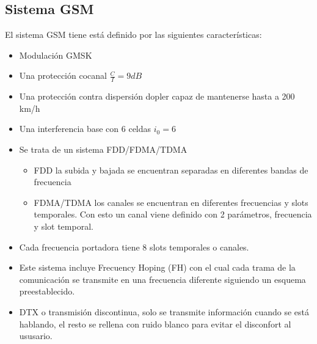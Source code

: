 \subsection{Sistema \acrshort{GSM}}
\label{sub:GSM}
El sistema \acrshort{GSM} tiene está definido por las siguientes características:
\begin{itemize}
	\item Modulación GMSK
	\item Una protección cocanal $\frac{C}{I}=9dB$
	\item Una protección contra dispersión dopler capaz de mantenerse hasta a 200 km/h
	\item Una interferencia base con 6 celdas $i_0=6$
	\item Se trata de un sistema \acrshort{FDD}/\acrshort{FDMA}/\acrshort{TDMA}
	\begin{itemize}
		\item \acrshort{FDD} la subida y bajada se encuentran separadas en diferentes bandas de frecuencia
		\item \acrshort{FDMA}/\acrshort{TDMA} los canales se encuentran en diferentes frecuencias y slots temporales. Con esto un canal viene definido con 2 parámetros, frecuencia y slot temporal.
	\end{itemize}
	\item Cada frecuencia portadora tiene 8 slots temporales o canales.
	\item Este sistema incluye Frecuency Hoping (\acrshort{FH}) con el cual cada trama de la comunicación se transmite en una frecuencia diferente siguiendo un esquema preestablecido.
	\item DTX o transmisión discontinua, solo se transmite información cuando se está hablando, el resto se rellena con ruido blanco para evitar el disconfort al ususario.
\end{itemize}
